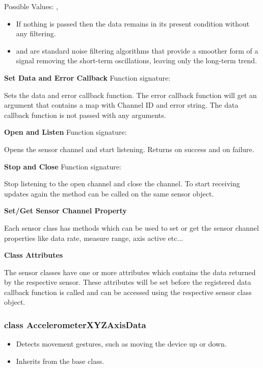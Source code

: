 Possible Values: , 

\begin{itemize}
\item If nothing is passed then the data remains in its present condition without any filtering.
\item {} and  are standard noise filtering algorithms that provide a smoother form of a signal removing the short-term oscillations, leaving only the long-term trend.
\end{itemize}

{\bf Set Data and Error Callback} \break
Function signature: 

Sets the data and error callback function. The error callback function will get an argument that contains a map with Channel ID and error string. The data callback function is not passed with any arguments.

{\bf Open and Listen} \break
Function signature: 

Opens the sensor channel and start listening. Returns  on success and  on failure.

{\bf Stop and Close} \break
Function signature: 

Stop listening to the open channel and close the channel. To start receiving updates again the  method can be called on the same sensor object.

{\bf Set/Get Sensor Channel Property} \break

Each sensor class has methods which can be used to set or get the sensor channel properties like data rate, measure range, axis active etc...

{\bf Class Attributes} \break

The sensor classes have one or more attributes which contains the data returned by the respective sensor. These attributes will be set before the registered data callback function is called and can be accessed using the respective sensor class object.

\subsubsection{class AccelerometerXYZAxisData}

\begin{itemize}
\item Detects movement gestures, such as moving the device up or down.
\item Inherits from the  base class.
\end{itemize}

